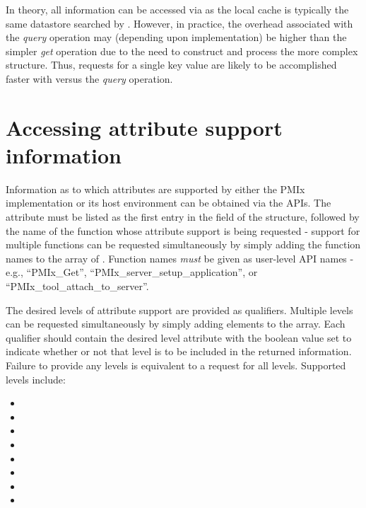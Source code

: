 In theory, all information can be accessed via  as the local cache is typically the same datastore searched by . However, in practice, the overhead associated with the \emph{query} operation may (depending upon implementation) be higher than the simpler \emph{get} operation due to the need to construct and process the more complex  structure. Thus, requests for a single key value are likely to be accomplished faster with  versus the \emph{query} operation.


\section{Accessing attribute support information}
\label{chap:api_job_mgmt:queryattrs}

Information as to which attributes are supported by either the \ac{PMIx} implementation or its host environment can be obtained via the  \acp{API}. The  attribute must be listed as the first entry in the  field of the  structure, followed by the name of the function whose attribute support is being requested - support for multiple functions can be requested simultaneously by simply adding the function names to the array of . Function names \emph{must} be given as user-level \ac{API} names - e.g., ``PMIx_Get'', ``PMIx_server_setup_application'', or ``PMIx_tool_attach_to_server''.

The desired levels of attribute support are provided as qualifiers. Multiple levels can be requested simultaneously by simply adding elements to the  array. Each qualifier should contain the desired level attribute with the boolean value set to indicate whether or not that level is to be included in the returned information. Failure to provide any levels is equivalent to a request for all levels. Supported levels include:

\begin{itemize}
    \item {}
    \item {}
    \item {}
    \item {}
    \item {}
    \item {}
    \item {}
    \item {}
\end{itemize}

